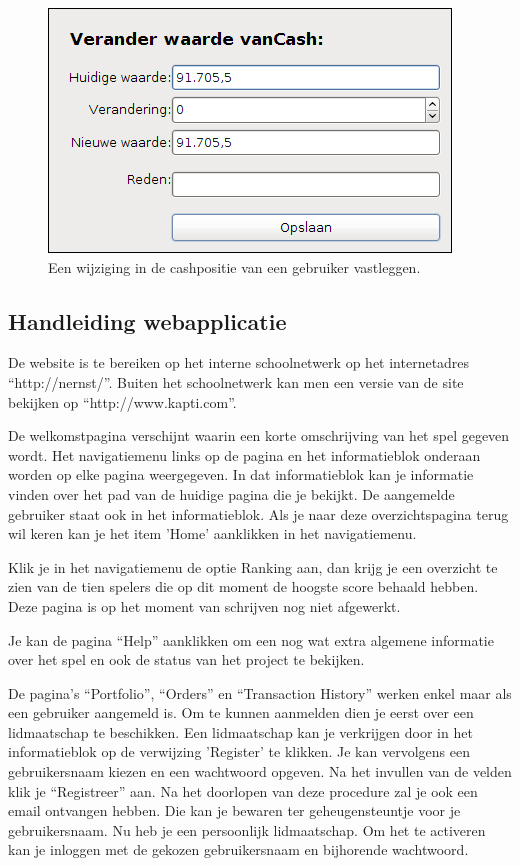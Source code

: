 \begin{figure}[h!]
	\centering
		\includegraphics[scale=0.75]{images/handleiding/administratie/gebruikers-edit-cash}
	\caption{Een wijziging in de cashpositie van een gebruiker vastleggen.}
			\label{fig:handl:admin:gebruikers-edit-cash}
\end{figure}

\subsection{Handleiding webapplicatie}

De website is te bereiken op het interne schoolnetwerk op het internetadres ``http://nernst/''.
Buiten het schoolnetwerk kan men een versie van de site bekijken op ``http://www.kapti.com''.

De welkomstpagina verschijnt waarin een korte omschrijving van het spel gegeven wordt. Het navigatiemenu links op de pagina en het informatieblok onderaan worden op elke pagina weergegeven. In dat informatieblok kan je informatie vinden over het pad van de huidige pagina die je bekijkt. De aangemelde gebruiker staat ook in het informatieblok. Als je naar deze overzichtspagina terug wil keren kan je het item 'Home' aanklikken in het navigatiemenu.

Klik je in het navigatiemenu de optie Ranking aan, dan krijg je een overzicht te zien van de tien spelers die op dit moment de hoogste score behaald hebben.
Deze pagina is op het moment van schrijven nog niet afgewerkt.

Je kan de pagina ``Help'' aanklikken om een nog wat extra algemene informatie over het spel en ook de status van het project te bekijken.

De pagina's ``Portfolio'', ``Orders'' en ``Transaction History'' werken enkel maar als een gebruiker aangemeld is.
Om te kunnen aanmelden dien je eerst over een lidmaatschap te beschikken. Een lidmaatschap kan je verkrijgen door in het informatieblok op de verwijzing 'Register' te klikken. Je kan vervolgens een gebruikersnaam kiezen en een wachtwoord opgeven. Na het invullen van de velden klik je ``Registreer'' aan.
Na het doorlopen van deze procedure zal je ook een email ontvangen hebben. Die kan je bewaren ter geheugensteuntje voor je gebruikersnaam.
Nu heb je een persoonlijk lidmaatschap. Om het te activeren kan je inloggen met de gekozen gebruikersnaam en bijhorende wachtwoord.

